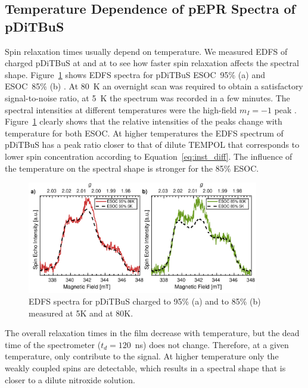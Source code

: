 \subsection{Temperature Dependence of pEPR Spectra of pDiTBuS}
Spin relaxation times usually depend on temperature. We measured EDFS of charged pDiTBuS at  and at  to see how faster spin relaxation affects the spectral shape. Figure~\ref{fig:Figure_6} shows EDFS spectra for pDiTBuS  ESOC~95\% (a) and  ESOC~85\% (b) . At 80~K an overnight scan was required to obtain a satisfactory signal-to-noise ratio,  at 5~K the spectrum was recorded in a few minutes. The spectral intensities at different temperatures were   the high-field $m_I=-1$ peak . Figure~\ref{fig:Figure_6} clearly shows that the relative intensities of the peaks change with temperature for both ESOC. At higher temperatures the EDFS spectrum of pDiTBuS has a peak ratio closer to that of dilute TEMPOL that corresponds to  lower spin concentration\ik{,} according to Equation~\ref{eq:inst_diff}. The influence of the temperature  on the spectral shape is stronger for the  85\% ESOC.

\begin{figure}[ht]
\center
	\includegraphics[width=0.9\textwidth]{./pulse/figures/Figure_6.pdf}
	\caption{EDFS spectra for pDiTBuS charged to 95\% (a) and to 85\% (b) measured at 5K and at 80K.}
	\label{fig:Figure_6}
\end{figure}


The overall relaxation times in the film decrease with  temperature, but the dead time of the spectrometer ($t_d=120$~ns) does not change. Therefore, at a given temperature, only  contribute to the signal. At higher temperature only the weakly coupled spins  are detectable, which results in a spectral shape that is closer to a dilute nitroxide solution.\\

